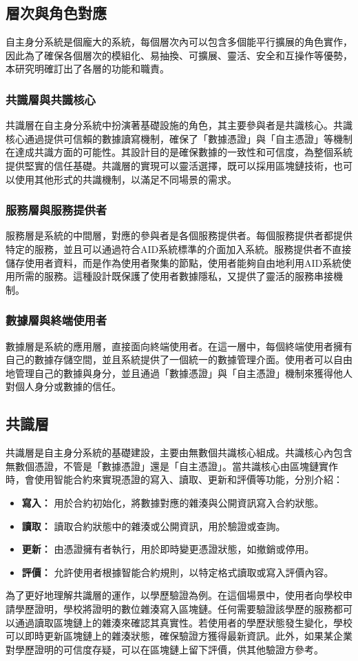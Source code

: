 \subsection{層次與角色對應}
自主身分系統是個龐大的系統，每個層次內可以包含多個能平行擴展的角色實作，因此為了確保各個層次的模組化、易抽換、可擴展、靈活、安全和互操作等優勢，本研究明確訂出了各層的功能和職責。
\subsubsection{共識層與共識核心}
共識層在自主身分系統中扮演著基礎設施的角色，其主要參與者是共識核心。共識核心通過提供可信賴的數據讀寫機制，確保了「數據憑證」與「自主憑證」等機制在達成共識方面的可能性。其設計目的是確保數據的一致性和可信度，為整個系統提供堅實的信任基礎。共識層的實現可以靈活選擇，既可以採用區塊鏈技術，也可以使用其他形式的共識機制，以滿足不同場景的需求。
\subsubsection{服務層與服務提供者}
服務層是系統的中間層，對應的參與者是各個服務提供者。每個服務提供者都提供特定的服務，並且可以通過符合AID系統標準的介面加入系統。服務提供者不直接儲存使用者資料，而是作為使用者聚集的節點，使用者能夠自由地利用AID系統使用所需的服務。這種設計既保護了使用者數據隱私，又提供了靈活的服務串接機制。
\subsubsection{數據層與終端使用者}
數據層是系統的應用層，直接面向終端使用者。在這一層中，每個終端使用者擁有自己的數據存儲空間，並且系統提供了一個統一的數據管理介面。使用者可以自由地管理自己的數據與身分，並且通過「數據憑證」與「自主憑證」機制來獲得他人對個人身分或數據的信任。
\subsection{共識層}
共識層是自主身分系統的基礎建設，主要由無數個共識核心組成。共識核心內包含無數個憑證，不管是「數據憑證」還是「自主憑證」。當共識核心由區塊鏈實作時，會使用智能合約來實現憑證的寫入、讀取、更新和評價等功能，分別介紹：
\begin{itemize}
  \item \textbf{寫入：} 用於合約初始化，將數據對應的雜湊與公開資訊寫入合約狀態。
  \item \textbf{讀取：} 讀取合約狀態中的雜湊或公開資訊，用於驗證或查詢。
  \item \textbf{更新：} 由憑證擁有者執行，用於即時變更憑證狀態，如撤銷或停用。
  \item \textbf{評價：} 允許使用者根據智能合約規則，以特定格式讀取或寫入評價內容。
\end{itemize}
為了更好地理解共識層的運作，以學歷驗證為例。在這個場景中，使用者向學校申請學歷證明，學校將證明的數位雜湊寫入區塊鏈。任何需要驗證該學歷的服務都可以通過讀取區塊鏈上的雜湊來確認其真實性。若使用者的學歷狀態發生變化，學校可以即時更新區塊鏈上的雜湊狀態，確保驗證方獲得最新資訊。此外，如果某企業對學歷證明的可信度存疑，可以在區塊鏈上留下評價，供其他驗證方參考。
